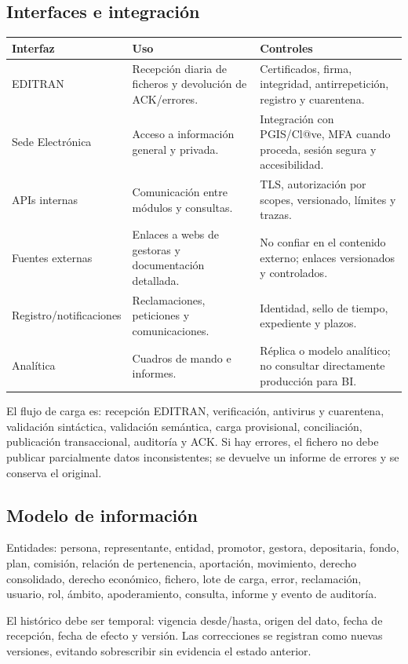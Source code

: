 \documentclass[11pt,a4paper]{article}
\begin{document}
\subsection{Interfaces e integración}
\begin{center}
\begin{tabularx}{0.95\textwidth}{l Y Y}\toprule
\textbf{Interfaz} & \textbf{Uso} & \textbf{Controles}\\\midrule
EDITRAN & Recepción diaria de ficheros y devolución de ACK/errores. & Certificados, firma, integridad, antirrepetición, registro y cuarentena.\\
Sede Electrónica & Acceso a información general y privada. & Integración con PGIS/Cl@ve, MFA cuando proceda, sesión segura y accesibilidad.\\
APIs internas & Comunicación entre módulos y consultas. & TLS, autorización por scopes, versionado, límites y trazas.\\
Fuentes externas & Enlaces a webs de gestoras y documentación detallada. & No confiar en el contenido externo; enlaces versionados y controlados.\\
Registro/notificaciones & Reclamaciones, peticiones y comunicaciones. & Identidad, sello de tiempo, expediente y plazos.\\
Analítica & Cuadros de mando e informes. & Réplica o modelo analítico; no consultar directamente producción para BI.\\\bottomrule
\end{tabularx}\end{center}

El flujo de carga es: recepción EDITRAN, verificación, antivirus y cuarentena, validación sintáctica, validación semántica, carga provisional, conciliación, publicación transaccional, auditoría y ACK. Si hay errores, el fichero no debe publicar parcialmente datos inconsistentes; se devuelve un informe de errores y se conserva el original.

\subsection{Modelo de información}
Entidades: persona, representante, entidad, promotor, gestora, depositaria, fondo, plan, comisión, relación de pertenencia, aportación, movimiento, derecho consolidado, derecho económico, fichero, lote de carga, error, reclamación, usuario, rol, ámbito, apoderamiento, consulta, informe y evento de auditoría.

El histórico debe ser temporal: vigencia desde/hasta, origen del dato, fecha de recepción, fecha de efecto y versión. Las correcciones se registran como nuevas versiones, evitando sobrescribir sin evidencia el estado anterior.
\end{document}
